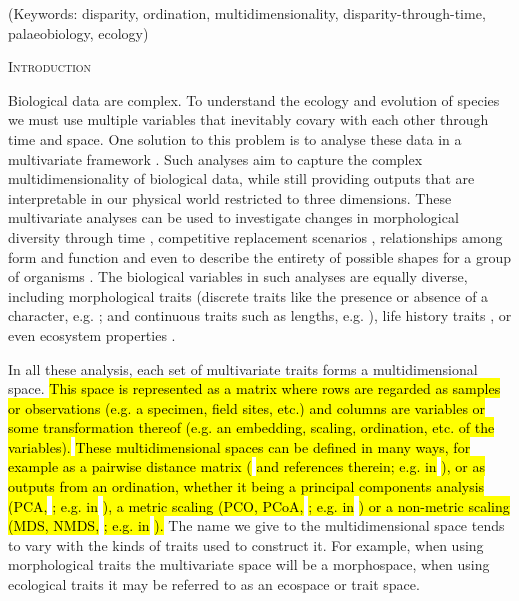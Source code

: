 \documentclass[12pt,letterpaper]{article}
\renewcommand{\section}[1]{%
\bigskip
\begin{center}
\begin{Large}
\normalfont\scshape #1
\medskip
\end{Large}
\end{center}}
\begin{document}
\noindent (Keywords: disparity, ordination, multidimensionality, disparity-through-time, palaeobiology, ecology)\\

\vspace{1.5in}

\newpage 

%
%

\section{Introduction}

Biological data are complex.
To understand the ecology and evolution of species we must use multiple variables that inevitably covary with each other through time and space.
One solution to this problem is to analyse these data in a multivariate framework \citep[e.g.][]{price2015predation,diaz2016global}.
Such analyses aim to capture the complex multidimensionality of biological data, while still providing outputs that are interpretable in our physical world restricted to three dimensions.
These multivariate analyses can be used to investigate changes in morphological diversity through time \citep{Close2015}, competitive replacement scenarios \citep{Brusatte12092008}, relationships among form and function \citep{diaz2016global} and even to describe the entirety of possible shapes for a group of organisms \citep{raup1966geometric}.
The biological variables in such analyses are equally diverse, including morphological traits (discrete traits like the presence or absence of a character, e.g. \citealt{brusattedinosaur2012}; and continuous traits such as lengths, e.g. \citealt{price2015predation}), life history traits \citep[e.g.][]{diaz2016global}, or even ecosystem properties \citep[e.g.][]{DonohueDim}. 

In all these analysis, each set of multivariate traits forms a multidimensional space.
\hl{This space is represented as a matrix where rows are regarded as samples or observations (e.g. a specimen, field sites, etc.) and columns are variables or some transformation thereof (e.g. an embedding, scaling, ordination, etc. of the variables).}
\hl{These multidimensional spaces can be defined in many ways, for example as a pairwise distance matrix (}
\citealt{lloyd2016estimating}
\hl{and references therein; e.g. in}
\citealt{Close2015}
\hl{), or as outputs from an ordination, whether it being a principal components analysis (PCA,}
\citealt{PCA}
\hl{; e.g. in}
\citealt{zelditch2012geometric}
\hl{), a metric scaling (PCO, PCoA,}
\citealt{PCO}
\hl{; e.g. in}
\citealt{Brusatte12092008}
\hl{) or a non-metric scaling (MDS, NMDS,}
\citealt{MDS}
\hl{; e.g. in}
\citealt{Liow2004,DonohueDim}
\hl{).}
The name we give to the multidimensional space tends to vary with the kinds of traits used to construct it. 
For example, when using morphological traits the multivariate space will be a morphospace, when using ecological traits it may be referred to as an ecospace or trait space.
\end{document}
